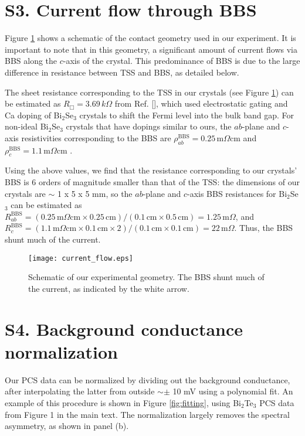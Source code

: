\documentclass[aps,prl,onecolumn,notitlepage,reprintnumbers,amsmath,amssymb,superscriptaddress,citeautoscript]{revtex4-1}
\begin{document}
\section{S3. Current flow through BBS}

Figure \ref{fig:current_flow} shows a schematic of the contact geometry used in our experiment. It is important to note that in this geometry, a significant amount of current flows via BBS along the $c$-axis of the crystal. This predominance of BBS is due to the large difference in resistance between TSS and BBS, as detailed below. 

The sheet resistance corresponding to the TSS in our crystals (see Figure \ref{fig:current_flow}) can be estimated as $R_{\Box}=3.69\,k\Omega$ from Ref. [], which used electrostatic gating and Ca doping of Bi$_{2}$Se$_{3}$ crystals to shift the Fermi level into the bulk band gap. For non-ideal Bi$_{2}$Se$_{3}$ crystals that have dopings similar to ours, the $ab$-plane and $c$-axis resistivities corresponding to the BBS are $\rho_{ab}^{\mathrm{BBS}}=0.25\,\mathrm{m}\Omega\mathrm{cm}$ \cite{Analytis2010} and $\rho_{c}^{\mathrm{BBS}}=1.1\,\mathrm{m}\Omega\mathrm{cm}$ \cite{Gobrecht1969}.

Using the above values, we find that the resistance corresponding to our crystals' BBS is 6 orders of magnitude smaller than that of the TSS: the dimensions of our crystals are $\sim$ 1 x 5 x 5 mm, so the $ab$-plane and $c$-axis BBS resistances for Bi$_{2}$Se$_{3}$ can be estimated as $R_{ab}^{\mathrm{BBS}}=\left(0.25\,\mathrm{m}\Omega\mathrm{cm}\times0.25\,\mathrm{cm}\right)/(0.1\,\mathrm{cm}\times0.5\,\mathrm{cm})=1.25\,\mathrm{m}\Omega$, and $R_{c}^{\mathrm{BBS}}=\left(1.1\,\mathrm{m}\Omega\mathrm{cm}\times0.1\,\mathrm{cm}\times2\right)/(0.1\,\mathrm{cm}\times0.1\,\mathrm{cm})=22\,\mathrm{m}\Omega$. Thus, the BBS shunt much of the current.


\begin{figure}[ht]
\texttt{[image: current\_flow.eps]}
\caption{\label{fig:current_flow} Schematic of our experimental geometry. The BBS shunt much of the current, as indicated by the white arrow.}
\end{figure} 

\section{S4. Background conductance normalization}

Our PCS data can be normalized by dividing out the background conductance, after interpolating the latter from outside $\sim\pm$ 10 mV using a polynomial fit. An example of this procedure is shown in Figure \ref{fig:fitting}, using Bi$_{2}$Te$_{3}$ PCS data from Figure 1 in the main text. The normalization largely removes the spectral asymmetry, as shown in panel (b).
\end{document}
